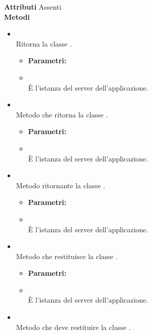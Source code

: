 \textbf{Attributi}
Assenti \\
\textbf{Metodi}
\begin{itemize}
\item[] \textbf{} \\ Ritorna la classe .
\begin{itemize}\addtolength{\itemsep}{-0.5\baselineskip}
\item[] \textbf{Parametri:}
\item[]  \\ È l'istanza del server dell'applicazione.
\end{itemize}
\item[] \textbf{} \\ Metodo che ritorna la classe .
\begin{itemize}\addtolength{\itemsep}{-0.5\baselineskip}
\item[] \textbf{Parametri:}
\item[]  \\ È l'istanza del server dell'applicazione.
\end{itemize}
\item[] \textbf{} \\ Metodo ritornante la classe .
\begin{itemize}\addtolength{\itemsep}{-0.5\baselineskip}
\item[] \textbf{Parametri:}
\item[]  \\ È l'istanza del server dell'applicazione.
\end{itemize}
\item[] \textbf{} \\ Metodo che restituisce la classe .
\begin{itemize}\addtolength{\itemsep}{-0.5\baselineskip}
\item[] \textbf{Parametri:}
\item[]  \\ È l'istanza del server dell'applicazione.
\end{itemize}
\item[] \textbf{} \\ Metodo che deve restituire la classe .
\begin{itemize}\addtolength{\itemsep}{-0.5\baselineskip}

\end{itemize}
\end{itemize}
